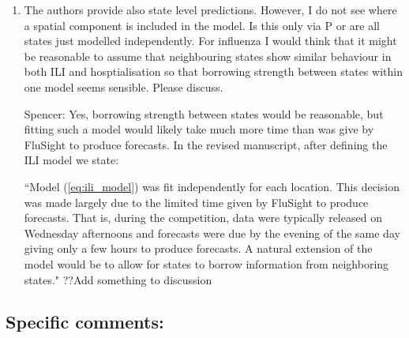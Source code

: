 \documentclass{article}
\newcommand{\spencer}[1]{{\color{blue} Spencer: #1}}
\begin{document}
\begin{enumerate}[1.]
\item The authors provide also state level predictions. However, I do not see 
where a spatial component is included in the model. Is this only via P or are 
all states just modelled independently. For influenza I would think that it 
might be reasonable to assume that neighbouring states show similar behaviour 
in both ILI and hosptialisation so that borrowing strength between states 
within one model seems sensible. Please discuss.


\spencer{Yes, borrowing strength between states would be reasonable, but 
fitting such a model would likely take much more time than was give by FluSight
to produce forecasts. In the revised manuscript, after defining the ILI model
we state:

``Model (\ref{eq:ili_model}) was fit 
independently for each location. This decision was made largely due to the 
limited time given by FluSight to produce forecasts. That is,
during the competition, data were typically released on Wednesday afternoons and
forecasts were due by the evening of the same day giving only a few hours to 
produce forecasts. A natural extension of the model would be to allow for states
to borrow information from neighboring states." ??Add something to discussion}

\end{enumerate}


\subsection*{Specific comments:}
\end{document}
